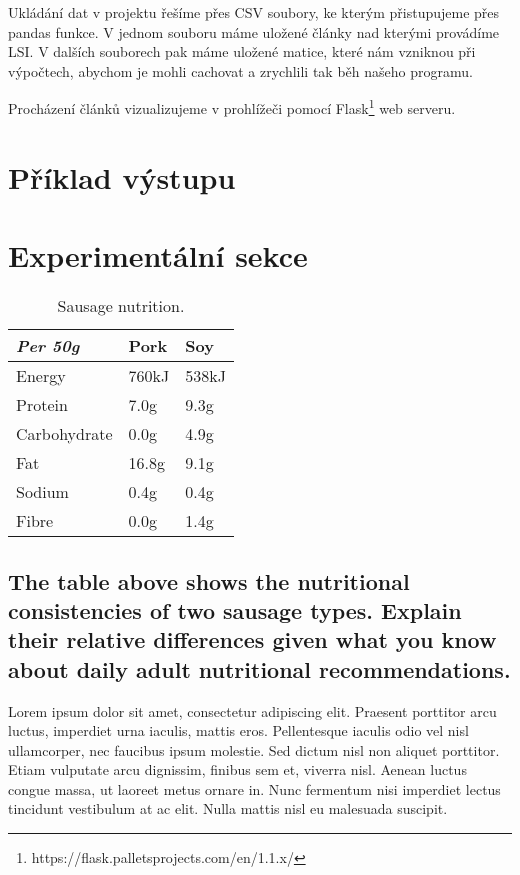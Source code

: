 \documentclass[11pt]{scrartcl} %
\begin{document}
\bigskip

Ukládání dat v projektu řešíme přes CSV soubory, ke kterým přistupujeme přes pandas funkce. V jednom souboru máme uložené články nad kterými provádíme LSI. V dalších souborech pak máme uložené matice, které nám vzniknou při výpočtech, abychom je mohli cachovat a zrychlili tak běh našeho programu.

\bigskip

Procházení článků vizualizujeme v prohlížeči pomocí Flask\footnote{https://flask.palletsprojects.com/en/1.1.x/} web serveru.

\section{Příklad výstupu}



\section{Experimentální sekce}

\begin{table}[h] %
	\centering %
	\begin{tabular}{l l l}
		\toprule
		\textit{Per 50g} & \textbf{Pork} & \textbf{Soy} \\
		\midrule
		Energy & 760kJ & 538kJ\\
		Protein & 7.0g & 9.3g\\
		Carbohydrate & 0.0g & 4.9g\\
		Fat & 16.8g & 9.1g\\
		Sodium & 0.4g & 0.4g\\
		Fibre & 0.0g & 1.4g\\
		\bottomrule
	\end{tabular}
	\caption{Sausage nutrition.}
\end{table}


\subsection{The table above shows the nutritional consistencies of two sausage types. Explain their relative differences given what you know about daily adult nutritional recommendations.}

Lorem ipsum dolor sit amet, consectetur adipiscing elit. Praesent porttitor arcu luctus, imperdiet urna iaculis, mattis eros. Pellentesque iaculis odio vel nisl ullamcorper, nec faucibus ipsum molestie. Sed dictum nisl non aliquet porttitor. Etiam vulputate arcu dignissim, finibus sem et, viverra nisl. Aenean luctus congue massa, ut laoreet metus ornare in. Nunc fermentum nisi imperdiet lectus tincidunt vestibulum at ac elit. Nulla mattis nisl eu malesuada suscipit.
\end{document}
